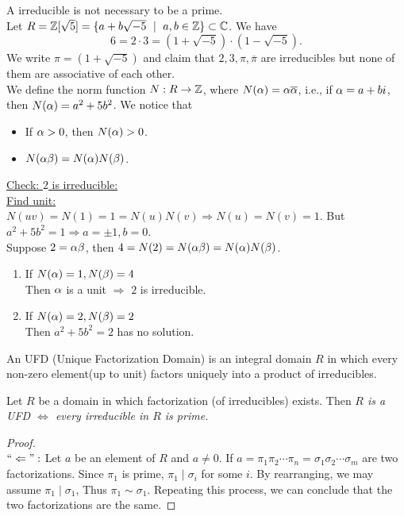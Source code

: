 \documentclass{mynotes}
\begin{document}
\begin{remark}
A irreducible is not necessary to be a prime.\\
Let $R = \Z[\sqrt{5}] = \{a+b\sqrt{-5}\ \mid \ a,b\in\Z\}\subset \C$. We have $$6=2\cdot3 = (1+\sqrt{-5})\cdot(1-\sqrt{-5}).$$We write $\pi = (1+\sqrt{-5})$ and claim that $2,3,\pi,\overline{\pi}$ are irreducibles but none of them are associative of each other.\\
We define the norm function $N:R\rightarrow \mathbb{Z}$, where $N(\alpha)=\alpha\overline{\alpha}$, i.e., if $\alpha = a+bi$, then $N(\alpha)=a^2+5b^2$. We notice that 
\begin{itemize}
\item If $\alpha>0$, then $N(\alpha)>0$.
\item $N(\alpha\beta)=N(\alpha)N(\beta)$.
\end{itemize}
\underline{Check: $2$ is irreducible:}\\
\underline{Find unit:} \\$N(uv) = N(1) = 1 = N(u)N(v) \Rightarrow N(u)=N(v) = 1$. But $a^2+5b^2 = 1\Rightarrow a=\pm1, b=0$.\\Suppose $2=\alpha\beta$, then $4=N(2) = N(\alpha\beta) = N(\alpha)N(\beta)$.
\begin{enumerate}
\item If $N(\alpha) = 1, N(\beta) = 4$\\
Then $\alpha$ is a unit $\Rightarrow$ $2$ is irreducible.
\item If $N(\alpha) = 2, N(\beta) = 2$\\
Then $a^2+5b^2 = 2$ has no solution.
\end{enumerate}
\end{remark}
\begin{definition}
An UFD (Unique Factorization Domain) is an integral domain $R$ in which every non-zero element(up to unit) factors uniquely into a product of irreducibles.
\end{definition}
\begin{proposition}
Let $R$ be a domain in which factorization (of irreducibles) exists. Then \emph{$R$ is a UFD $\Leftrightarrow$ every irreducible in $R$ is prime.}
\end{proposition}
\begin{proof}\mbox{}\\
$``\Leftarrow":$ Let $a$ be an element of $R$ and $a\ne0$. If $a=\pi_1\pi_2\cdots\pi_n=\sigma_1\sigma_2\cdots\sigma_m$ are two factorizations. Since $\pi_1$ is prime, $\pi_1\mid \sigma_i$ for some $i$. By rearranging, we may assume $\pi_1\mid \sigma_1$, Thus $\pi_1\sim \sigma_1$. Repeating this process, we can conclude that the two factorizations are the same.
\notcomplete
\end{proof}
\end{document}

